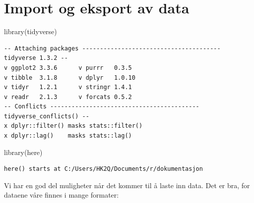 \documentclass[
  letterpaper,
  DIV=11,
  numbers=noendperiod]{scrreprt}
\newenvironment{Shaded}{\begin{snugshade}}{\end{snugshade}}
\newcommand{\FunctionTok}[1]{\textcolor[rgb]{0.28,0.35,0.67}{#1}}
\newcommand{\NormalTok}[1]{\textcolor[rgb]{0.00,0.23,0.31}{#1}}
\begin{document}

\hypertarget{sec-import-export}{%
\chapter{Import og eksport av data}\label{sec-import-export}}

\begin{Shaded}
\begin{Highlighting}[]
\FunctionTok{library}\NormalTok{(tidyverse)}
\end{Highlighting}
\end{Shaded}

\begin{verbatim}
-- Attaching packages --------------------------------------- tidyverse 1.3.2 --
v ggplot2 3.3.6      v purrr   0.3.5 
v tibble  3.1.8      v dplyr   1.0.10
v tidyr   1.2.1      v stringr 1.4.1 
v readr   2.1.3      v forcats 0.5.2 
-- Conflicts ------------------------------------------ tidyverse_conflicts() --
x dplyr::filter() masks stats::filter()
x dplyr::lag()    masks stats::lag()
\end{verbatim}

\begin{Shaded}
\begin{Highlighting}[]
\FunctionTok{library}\NormalTok{(here)}
\end{Highlighting}
\end{Shaded}

\begin{verbatim}
here() starts at C:/Users/HK2Q/Documents/r/dokumentasjon
\end{verbatim}

Vi har en god del muligheter når det kommer til å laste inn data. Det er
bra, for dataene våre finnes i mange formater:
\end{document}
